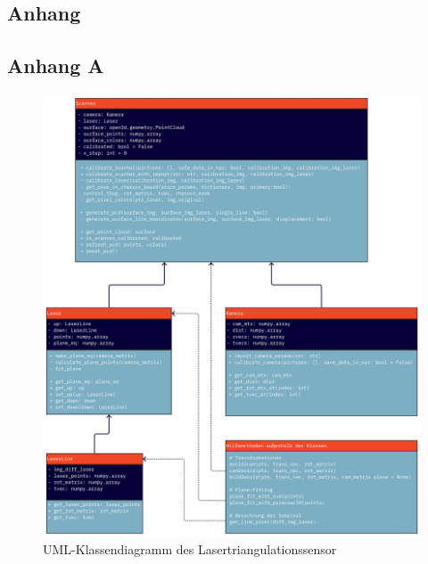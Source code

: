 \documentclass[	12pt,
				a4paper,
				bibliography=totoc,
				listof=totoc,
				index=totoc,
				twoside,
				headsepline,
				footsepline,
				ngerman]{scrartcl}
\begin{document}
\begin{appendix}
	\section{Anhang}
		\subsection{Anhang A}\label{anhang-a}
		\begin{figure}[h]
			\centering
			\includegraphics[width=0.93\linewidth]{img/anhang/UML_surface_scanner.jpg}
			\caption{UML-Klassendiagramm des Lasertriangulationssensor}
			\label{fig:uml_all}
		\end{figure}
		\newpage

\end{appendix}
\end{document}
